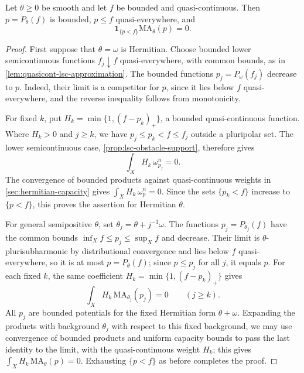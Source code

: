 \begin{theorem}\label{thm:bounded-contact-support}
Let $\theta\geq0$ be smooth and let $f$ be bounded and quasi-continuous. Then $p=P_\theta(f)$ is bounded, $p\leq f$ quasi-everywhere, and
\[
 \mathbf1_{\{p<f\}}\mathrm{MA}_\theta(p)=0.
\]
\end{theorem}
\begin{proof}
First suppose that $\theta=\omega$ is Hermitian. Choose bounded lower semicontinuous functions $f_j\downarrow f$ quasi-everywhere, with common bounds, as in \cref{lem:quasicont-lsc-approximation}. The bounded functions $p_j=P_\omega(f_j)$ decrease to $p$. Indeed, their limit is a competitor for $p$, since it lies below $f$ quasi-everywhere, and the reverse inequality follows from monotonicity.

For fixed $k$, put $H_k=\min\{1,(f-p_k)_+\}$, a bounded quasi-continuous function. Where $H_k>0$ and $j\geq k$, we have $p_j\leq p_k<f\leq f_j$ outside a pluripolar set. The lower semicontinuous case, \cref{prop:lsc-obstacle-support}, therefore gives
\[
 \int_X H_k\,\omega_{p_j}^n=0.
\]
The convergence of bounded products against quasi-continuous weights in \cref{sec:hermitian-capacity} gives
$\int_XH_k\,\omega_p^n=0$. Since the sets $\{p_k<f\}$ increase to $\{p<f\}$, this proves the assertion for Hermitian $\theta$.

For general semipositive $\theta$, set $\theta_j=\theta+j^{-1}\omega$. The functions $p_j=P_{\theta_j}(f)$ have the common bounds $\inf_Xf\leq p_j\leq\sup_Xf$ and decrease. Their limit is $\theta$-plurisubharmonic by distributional convergence and lies below $f$ quasi-everywhere, so it is at most $p=P_\theta(f)$; since $p\leq p_j$ for all $j$, it equals $p$. For each fixed $k$, the same coefficient $H_k=\min\{1,(f-p_k)_+\}$ gives
\[
 \int_XH_k\,\mathrm{MA}_{\theta_j}(p_j)=0\qquad(j\geq k).
\]
All $p_j$ are bounded potentials for the fixed Hermitian form $\theta+\omega$. Expanding the products with background $\theta_j$ with respect to this fixed background, we may use convergence of bounded products and uniform capacity bounds to pass the last identity to the limit, with the quasi-continuous weight $H_k$; this gives $\int_XH_k\,\mathrm{MA}_\theta(p)=0$. Exhausting $\{p<f\}$ as before completes the proof.
\end{proof}
